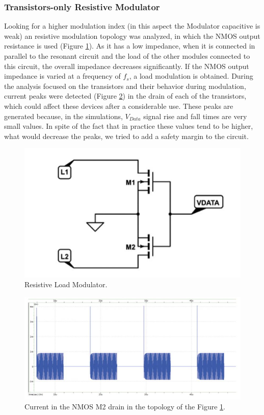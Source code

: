 \documentclass{article} %
\begin{document}
\begin{multicols}{2}
\subsubsection{Transistors-only Resistive Modulator}
Looking for a higher modulation index (in this aspect the Modulator capacitive is weak) an resistive modulation topology was analyzed, in which the NMOS output resistance is used (Figure  \ref{fig:Mod_carg_trans}). As it has a low impedance, when it is connected in parallel to the resonant circuit and the load of the other modules connected to this circuit, the overall impedance decreases significantly. If the NMOS output impedance is varied at a frequency of $f_s$, a load modulation is obtained. During the analysis focused on the transistors and their behavior during modulation, current peaks were detected (Figure \ref{fig:Picos_Cor}) in the drain of each of the transistors, which could affect these devices after a considerable use. These peaks are generated because, in the simulations, $V_{Data}$ signal rise and fall times are very small values. In spite of the fact that in practice these values tend to be higher, what would decrease the peaks, we tried to add a safety margin to the circuit.

\begin{figure}[H]
\centering
\includegraphics[scale=0.5]{Images/ImagenesTesina/Antecedentes/Modulacion_Carga_Trans.JPG}
\caption{Resistive Load Modulator.}
\label{fig:Mod_carg_trans}
\end{figure}

\begin{figure}[H]
\centering
\includegraphics[scale=0.4]{Images/ImagenesTesina/Antecedentes/Picos_Corriente.JPG}
\caption{Current in the NMOS M2 drain in the topology of the Figure  \ref{fig:Mod_carg_trans}.}
\label{fig:Picos_Cor}
\end{figure}



\end{multicols}
\end{document}
